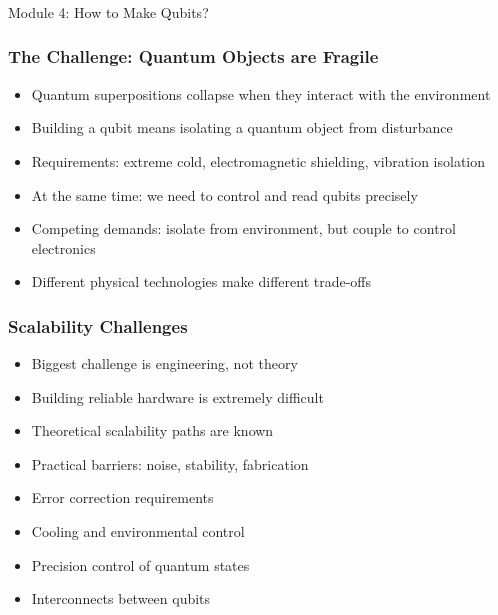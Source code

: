 
\begin{frame}[fragile]\frametitle{}
\begin{center}
{\Large Module 4: How to Make Qubits?}
\end{center}
\end{frame}

\begin{frame}[fragile]\frametitle{The Challenge: Quantum Objects are Fragile}
\begin{itemize}
\item Quantum superpositions collapse when they interact with the environment
\item Building a qubit means isolating a quantum object from disturbance
\item Requirements: extreme cold, electromagnetic shielding, vibration isolation
\item At the same time: we need to control and read qubits precisely
\item Competing demands: isolate from environment, but couple to control electronics
\item Different physical technologies make different trade-offs
\end{itemize}
\end{frame}

\begin{frame}[fragile]\frametitle{Scalability Challenges}
\begin{itemize}
\item Biggest challenge is engineering, not theory
\item Building reliable hardware is extremely difficult
\item Theoretical scalability paths are known
\item Practical barriers: noise, stability, fabrication
\item Error correction requirements
\item Cooling and environmental control
\item Precision control of quantum states
\item Interconnects between qubits
\end{itemize}
\end{frame}

